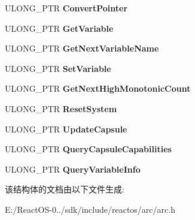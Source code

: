 \begin{DoxyCompactItemize}
U\+L\+O\+N\+G\+\_\+\+P\+TR {\bfseries Convert\+Pointer}
\item 
\mbox{\label{struct___v_i_r_t_u_a_l___e_f_i___r_u_n_t_i_m_e___s_e_r_v_i_c_e_s_a849bc41a17f1ae059ac59beb3b573ecd}} 
U\+L\+O\+N\+G\+\_\+\+P\+TR {\bfseries Get\+Variable}
\item 
\mbox{\label{struct___v_i_r_t_u_a_l___e_f_i___r_u_n_t_i_m_e___s_e_r_v_i_c_e_s_a341550294cf56944408da93f399f547a}} 
U\+L\+O\+N\+G\+\_\+\+P\+TR {\bfseries Get\+Next\+Variable\+Name}
\item 
\mbox{\label{struct___v_i_r_t_u_a_l___e_f_i___r_u_n_t_i_m_e___s_e_r_v_i_c_e_s_a0ce750da12467efda6a67961b96d8d99}} 
U\+L\+O\+N\+G\+\_\+\+P\+TR {\bfseries Set\+Variable}
\item 
\mbox{\label{struct___v_i_r_t_u_a_l___e_f_i___r_u_n_t_i_m_e___s_e_r_v_i_c_e_s_ae6790f1802e36fd2b70439c0d6296630}} 
U\+L\+O\+N\+G\+\_\+\+P\+TR {\bfseries Get\+Next\+High\+Monotonic\+Count}
\item 
\mbox{\label{struct___v_i_r_t_u_a_l___e_f_i___r_u_n_t_i_m_e___s_e_r_v_i_c_e_s_a2ecb10baf859ce895f98e3f3005daba2}} 
U\+L\+O\+N\+G\+\_\+\+P\+TR {\bfseries Reset\+System}
\item 
\mbox{\label{struct___v_i_r_t_u_a_l___e_f_i___r_u_n_t_i_m_e___s_e_r_v_i_c_e_s_aa043187af0721bbe92cc4266a59ede25}} 
U\+L\+O\+N\+G\+\_\+\+P\+TR {\bfseries Update\+Capsule}
\item 
\mbox{\label{struct___v_i_r_t_u_a_l___e_f_i___r_u_n_t_i_m_e___s_e_r_v_i_c_e_s_a16d5092fbeeb23aa9afa58ad3deeb8b4}} 
U\+L\+O\+N\+G\+\_\+\+P\+TR {\bfseries Query\+Capsule\+Capabilities}
\item 
\mbox{\label{struct___v_i_r_t_u_a_l___e_f_i___r_u_n_t_i_m_e___s_e_r_v_i_c_e_s_a88d6b50ad1d7d1dd15611890929378b7}} 
U\+L\+O\+N\+G\+\_\+\+P\+TR {\bfseries Query\+Variable\+Info}
\end{DoxyCompactItemize}


该结构体的文档由以下文件生成\+:\begin{DoxyCompactItemize}
\item 
E\+:/\+React\+O\+S-\/0../sdk/include/reactos/arc/arc.\+h\end{DoxyCompactItemize}
